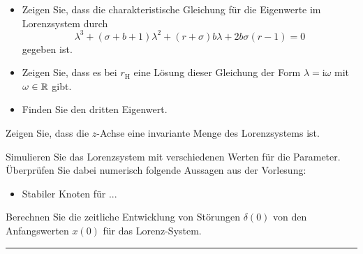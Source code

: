 \documentclass[11pt,a4paper]{article}
\begin{document}



\begin{aufg}
\mbox{}
\begin{itemize}
 \item Zeigen Sie, dass die charakteristische Gleichung für die Eigenwerte im
 Lorenzsystem durch
 \begin{equation}
  \lambda^3 + (\sigma + b + 1)\lambda^2 + (r+\sigma)b\lambda + 2b\sigma(r-1) = 0
 \end{equation}
 gegeben ist.
 \item Zeigen  Sie, dass es bei $r_{\textrm{H}}$ eine Lösung dieser Gleichung
 der Form $\lambda=\mathrm{i} \omega$ mit $\omega\in\mathbb{R}$ gibt.
 \item Finden Sie den dritten Eigenwert.
\end{itemize}

\end{aufg}

\bigskip%

\begin{aufg}
Zeigen Sie, dass die $z$-Achse eine invariante Menge des Lorenzsystems ist.
\end{aufg}

\bigskip%

\begin{aufg}
Simulieren Sie das Lorenzsystem mit verschiedenen Werten für die Parameter.
Überprüfen Sie dabei numerisch folgende Aussagen aus der Vorlesung:
\begin{itemize}
 \item Stabiler Knoten für ...
\end{itemize}
\end{aufg}


\bigskip%

\begin{aufg}
Berechnen Sie die zeitliche Entwicklung von Störungen $\delta(0)$ von den
Anfangswerten $x(0)$ für das Lorenz-System.
\end{aufg}


\bigskip
\hrule

\end{document}
